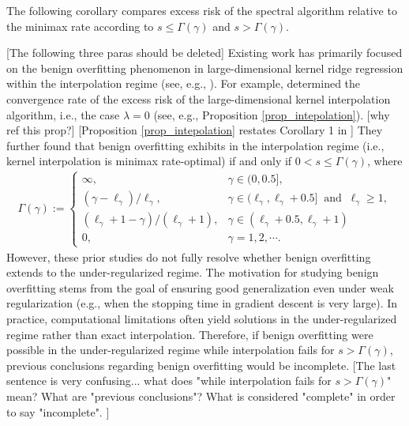 \documentclass{article}
\theoremstyle{plain}
\theoremstyle{definition}
\theoremstyle{remark}
\newcommand{\green}{\color{green}}
\newcommand{\dhnote}[1]{{\color{red}[#1]} } %
\begin{document}
The following corollary compares excess risk of the spectral algorithm relative to the minimax rate according to $s\leq \Gamma(\gamma)$  and $s>\Gamma(\gamma)$. 



\iffalse

{\color{red} [The following three paras should be deleted]} Existing work has primarily focused on the benign overfitting phenomenon in large-dimensional kernel ridge regression within the interpolation regime (see, e.g., \cite{Liang_Just_2019, liang2020multiple, aerni2023strong, barzilai2023generalization, zhang2024phase}). For example, \cite{zhang2024phase} determined the convergence rate of the excess risk of the large-dimensional kernel interpolation algorithm, i.e., the case $\lambda = 0$ (see, e.g., Proposition \ref{prop_intepolation}). 
\dhnote{why ref this prop?}
{\green [Proposition \ref{prop_intepolation} restates Corollary 1 in \cite{zhang2024phase}]}
They further found that benign overfitting exhibits in the interpolation regime (i.e., kernel interpolation is minimax rate-optimal) if and only if $0<s \leq \Gamma(\gamma)$, where
    \begin{equation}
        \begin{aligned}
    \Gamma(\gamma) := \begin{cases} 
    \infty,  & \gamma \in (0, 0.5], \\ 
    (\gamma-\ell_{\gamma})/\ell_{\gamma}, & \gamma \in (\ell_{\gamma}, \ell_{\gamma}+0.5] ~\text{ and }~ \ell_{\gamma} \geq 1, \\ 
    (\ell_{\gamma}+1-\gamma)/(\ell_{\gamma}+1), & \gamma \in (\ell_{\gamma}+0.5, \ell_{\gamma}+1)\\
    0, & \gamma =1, 2, \cdots.
    \end{cases}
    \end{aligned}
    \end{equation}
However, these prior studies do not fully resolve whether benign overfitting extends to the under-regularized regime. 
The motivation for studying benign overfitting stems from the goal of ensuring good generalization even under weak regularization (e.g., when the stopping time in gradient descent is very large). 
In practice, computational limitations often yield solutions in the under-regularized regime rather than exact interpolation. Therefore, if benign overfitting were possible in the under-regularized regime while interpolation fails for $s > \Gamma(\gamma)$, previous conclusions regarding benign overfitting would be incomplete.
\dhnote{The last sentence is very confusing... what does "while interpolation fails for $s > \Gamma(\gamma)$" mean? What are "previous conclusions"? What is considered "complete" in order to say "incomplete".  }
\end{document}
